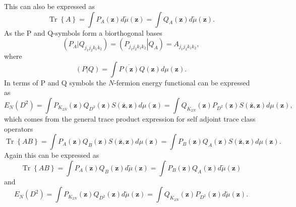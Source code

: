 \documentclass[aps,preprint]{revtex4}%
\begin{document}
This can also be expressed as
\begin{equation}
\operatorname*{Tr}\left\{  A\right\}  =\int P_{A}\left(  \mathbf{z}\right)
d\tilde{\mu}\left(  \mathbf{z}\right)  =\int Q_{A}\left(  \mathbf{z}\right)
d\tilde{\mu}\left(  \mathbf{z}\right)  .
\end{equation}
As the P and Q-symbols form a biorthogonal bases
\begin{equation}
\left(  \left.  P_{A}\right\vert Q_{j_{1}j_{2}k_{1}k_{2}}\right)  =\left(
\left.  P_{j_{1}j_{2}k_{1}k_{2}}\right\vert Q_{A}\right)  =A_{j_{1}j_{2}%
k_{1}k_{2}},
\end{equation}
where
\begin{equation}
\left(  \left.  P\right\vert Q\right)  =\int\overline{P\left(  \mathbf{z}%
\right)  }Q\left(  \mathbf{z}\right)  d\mu\left(  \mathbf{z}\right)  .
\end{equation}
In terms of P and Q symbols the $N$-fermion energy functional can be expressed
as
\begin{equation}
E_{N}\left(  D^{2}\right)  =\int P_{K_{2N}}\left(  \mathbf{z}\right)
Q_{D^{2}}\left(  \mathbf{z}\right)  S\left(  \mathbf{\bar{z},z}\right)
d\mu\left(  \mathbf{z}\right)  =\int Q_{K_{2N}}\left(  \mathbf{z}\right)
P_{D^{2}}\left(  \mathbf{z}\right)  S\left(  \mathbf{\bar{z},z}\right)
d\mu\left(  \mathbf{z}\right)  ,
\end{equation}
which comes from the general trace product expression for self adjoint trace
class operators
\begin{equation}
\operatorname*{Tr}\left\{  AB\right\}  =\int P_{A}\left(  \mathbf{z}\right)
Q_{B}\left(  \mathbf{z}\right)  S\left(  \mathbf{\bar{z},z}\right)
d\mu\left(  \mathbf{z}\right)  =\int P_{B}\left(  \mathbf{z}\right)
Q_{A}\left(  \mathbf{z}\right)  S\left(  \mathbf{\bar{z},z}\right)
d\mu\left(  \mathbf{z}\right)  .\nonumber
\end{equation}
Again this can be expressed as
\begin{equation}
\operatorname*{Tr}\left\{  AB\right\}  =\int P_{A}\left(  \mathbf{z}\right)
Q_{B}\left(  \mathbf{z}\right)  d\tilde{\mu}\left(  \mathbf{z}\right)  =\int
P_{B}\left(  \mathbf{z}\right)  Q_{A}\left(  \mathbf{z}\right)  d\tilde{\mu
}\left(  \mathbf{z}\right)
\end{equation}
and%
\begin{equation}
E_{N}\left(  D^{2}\right)  =\int P_{K_{2N}}\left(  \mathbf{z}\right)
Q_{D^{2}}\left(  \mathbf{z}\right)  d\tilde{\mu}\left(  \mathbf{z}\right)
=\int Q_{K_{2N}}\left(  \mathbf{z}\right)  P_{D^{2}}\left(  \mathbf{z}\right)
d\tilde{\mu}\left(  \mathbf{z}\right)  .
\end{equation}
\end{document}
